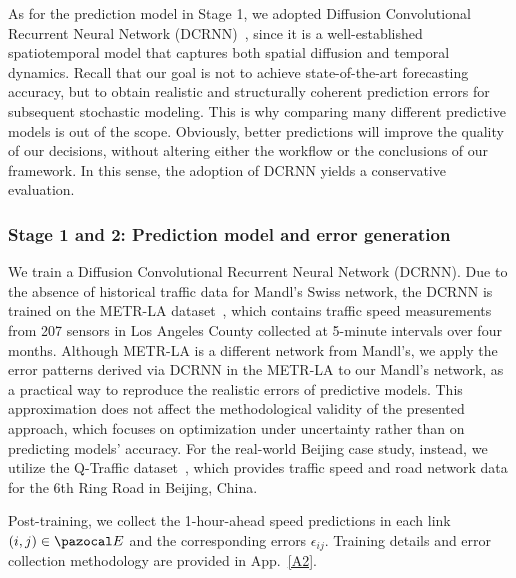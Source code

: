 \documentclass[a4paper,fleqn]{cas-sc}
\begin{document}
As for the prediction model in Stage 1, we adopted Diffusion Convolutional Recurrent Neural Network (DCRNN)~\citep{li2017diffusion}, since it is a well-established spatiotemporal model that captures both spatial diffusion and temporal dynamics. Recall that our goal is not to achieve state-of-the-art forecasting accuracy, but to obtain realistic and structurally coherent prediction errors for subsequent stochastic modeling. This is why comparing many different predictive models is out of the scope. Obviously, better predictions will improve the quality of our decisions, without altering either the workflow or the conclusions of our framework. In this sense, the adoption of DCRNN yields a conservative evaluation.


\subsubsection{Stage 1 and 2: Prediction model and error generation}\label{sec:errorStage1}

We train a Diffusion Convolutional Recurrent Neural Network (DCRNN). 
Due to the absence of historical traffic data for Mandl’s Swiss network, the DCRNN is trained on the METR-LA dataset~\citep{li2017diffusion}, which contains traffic speed measurements from 207 sensors in Los Angeles County collected at 5-minute intervals over four months. Although METR-LA is a different network from Mandl's, we apply the error patterns derived via DCRNN in the METR-LA to our Mandl's network, as a practical way to reproduce the realistic errors of predictive models. This approximation does not affect the methodological validity of the presented approach, which focuses on optimization under uncertainty rather than on predicting models' accuracy.
%
For the real-world Beijing case study, instead, we utilize the Q-Traffic dataset~\citep{liao2018deep}, which provides traffic speed and road network data for the 6th Ring Road in Beijing, China. 

Post-training, we collect the 1-hour-ahead speed predictions in each link $(i,j)\in\pazocal E$ and the corresponding errors $\epsilon_{ij}$.
Training details and error collection methodology are provided in App.~\ref{A2}.

\end{document}

